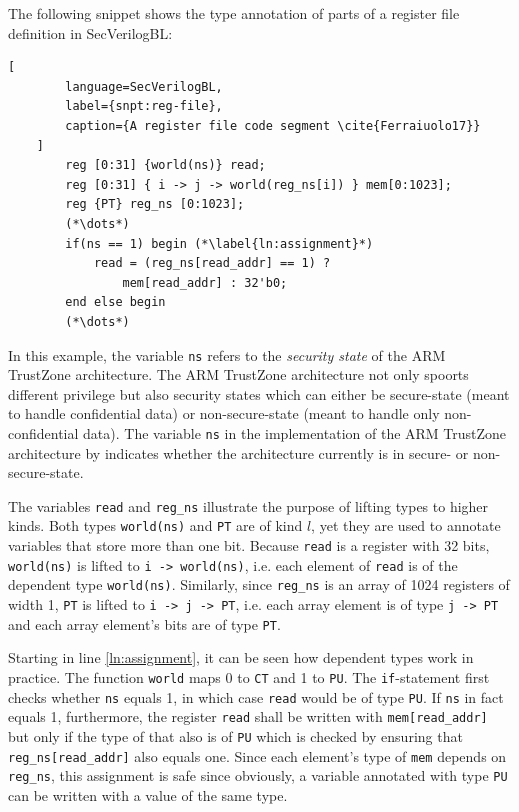 \begin{example}
    The following snippet shows the type annotation of parts of a register file definition in SecVerilogBL:
    \begin{lstlisting}[
        language=SecVerilogBL,
        label={snpt:reg-file},
        caption={A register file code segment \cite{Ferraiuolo17}}
    ]
        reg [0:31] {world(ns)} read;
        reg [0:31] { i -> j -> world(reg_ns[i]) } mem[0:1023];
        reg {PT} reg_ns [0:1023];
        (*\dots*)
        if(ns == 1) begin (*\label{ln:assignment}*)
            read = (reg_ns[read_addr] == 1) ?
                mem[read_addr] : 32'b0;
        end else begin
        (*\dots*)
    \end{lstlisting}

    In this example, the variable \lstinline{ns} refers to the \textit{security state} of the ARM TrustZone architecture.
    The ARM TrustZone architecture not only spoorts different privilege but also security states which can either be secure-state (meant to handle confidential data) or non-secure-state (meant to handle only non-confidential data).
    The variable \lstinline{ns} in the implementation of the ARM TrustZone architecture by \citeauthor{Ferraiuolo17} indicates whether the architecture currently is in secure- or non-secure-state.

    The variables \lstinline{read} and \lstinline{reg_ns} illustrate the purpose of lifting types to higher kinds.
    Both types \lstinline{world(ns)} and \lstinline{PT} are of kind $ l $, yet they are used to annotate variables that store more than one bit.
    Because \lstinline{read} is a register with 32 bits, \lstinline{world(ns)} is lifted to \lstinline{i -> world(ns)}, i.e. each element of \lstinline{read} is of the dependent type \lstinline{world(ns)}.
    Similarly, since \lstinline{reg_ns} is an array of 1024 registers of width 1, \lstinline{PT} is lifted to \lstinline{i -> j -> PT}, i.e. each array element is of type \lstinline{j -> PT} and  each array element's bits are of type \lstinline{PT}.

    Starting in line \ref{ln:assignment}, it can be seen how dependent types work in practice.
    The function \lstinline{world} maps 0 to \lstinline{CT} and 1 to \lstinline{PU}.
    The \lstinline{if}-statement first checks whether \lstinline{ns} equals 1, in which case \lstinline{read} would be of type \lstinline{PU}.
    If \lstinline{ns} in fact equals 1, furthermore, the register \lstinline{read} shall be written with \lstinline{mem[read_addr]} but only if the type of that also is of \lstinline{PU} which is checked by ensuring that \lstinline{reg_ns[read_addr]} also equals one.
    Since each element's type of \lstinline{mem} depends on \lstinline{reg_ns}, this assignment is safe since obviously, a variable annotated with type \lstinline{PU} can be written with a value of the same type.


\end{example}
